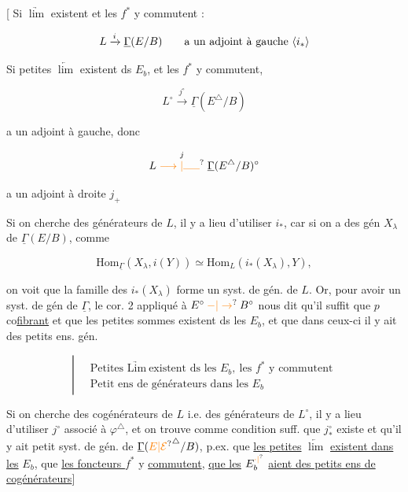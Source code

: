 
[ Si  $\underrightarrow{\lim}$ existent  et les $f^*$ y commutent :

\[
L\xrightarrow{i}\underline{\Gamma}(E/B)\qquad\text{a un adjoint à gauche }\inserted{i_*}
\]

Si petites $\underleftarrow{\lim}$ existent ds $E_b$, et les $f^*$ y commutent,

\[
L^\circ\xrightarrow{j^\circ}\underline{\Gamma}(E^{\triangle}/B)
\]

a un adjoint à gauche, donc

\[
L\mathrel{\overset{j}{\unsure{\longrightarrow|\rule{1.5em}{.35pt}}}}\underline{\Gamma}(E^\triangle/B)^\circ
\]

a un adjoint à droite $j_+$

Si on cherche des générateurs de $L$, il y a
lieu d'utiliser $i_*$, car  si on a des
gén $X_\lambda$ de $\underline{\Gamma}(E/B)$, comme

\[
\mathrm{Hom}_{\underline{\Gamma}}(X_\lambda,i(Y))\simeq
\mathrm{Hom}_L(i_*(X_\lambda),Y),
\]

on voit que la famille des $i_*(X_\lambda)$ forme un
syst. de gén. de $L$. Or, pour avoir un 
syst. de gén de $\underline{\Gamma}$, le cor. 2  appliqué
à $E^\circ\mathbin{\unsure{-|\to}}B^\circ$ nous dit qu'il suffit que
$p$ co\uline{fibrant} et que les petites sommes
existent ds les $E_b$, et que dans ceux-ci
il y ait des  petits ens. gén.

\[
\left|\ \begin{aligned}
&\text{Petites }\underrightarrow{\mathrm{Lim}}\ \text{existent ds les }E_b,\ \text{les }f^*\text{ y commutent}\\
&\text{Petit ens de générateurs dans les }E_b
\end{aligned}\right.
\]


Si on cherche des cogénérateurs de $L$
i.e. des générateurs de $L^\circ$, il y a lieu
d'utiliser $j^\circ$ associé à ${\varphi}^\triangle$, et on trouve
comme condition suff. que $j_*^\circ$ existe et qu'il
y ait petit syst. de gén. de $\underline{\Gamma}({\unsure{E|\mathcal E}}^\triangle/B)$,
p.ex. que \uline{les petites} $\underleftarrow{\lim}$ \uline{existent dans}
\uline{les} $E_b$, que \uline{les foncteurs $f^*$} y \uline{commutent},
\uline{que les} $E_b^{\unsure{\cdot|{}}}$ \uline{aient des petits ens de cogénérateurs}]

